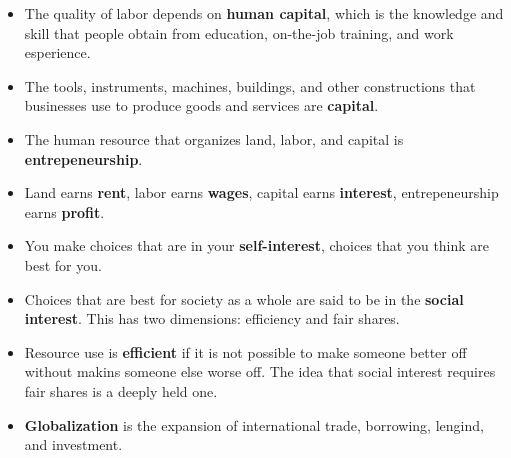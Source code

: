 \documentclass{article}
\begin{document}
\begin{description}
\begin{itemize}
        \item The quality of labor depends on \textbf{human capital}, which is the knowledge and skill that people obtain from education, on-the-job training, and work esperience.
        \item The tools, instruments, machines, buildings, and other constructions that businesses use to produce goods and services are \textbf{capital}.
        \item The human resource that organizes land, labor, and capital is \textbf{entrepeneurship}.
        \item Land earns \textbf{rent}, labor earns \textbf{wages}, capital earns \textbf{interest}, entrepeneurship earns \textbf{profit}.
        \item You make choices that are in your \textbf{self-interest}, choices that you think are  best for you.
        \item Choices that are best for society as a whole are said to be in the \textbf{social interest}. This has two dimensions: efficiency and fair shares.
        \item Resource use is \textbf{efficient} if it is not possible to make someone better off without makins someone else worse off. The idea that social interest requires fair shares is a deeply held one.
        \item \textbf{Globalization} is the expansion of international trade, borrowing, lengind, and investment.
    \end{itemize}
\end{description}
\end{document}
